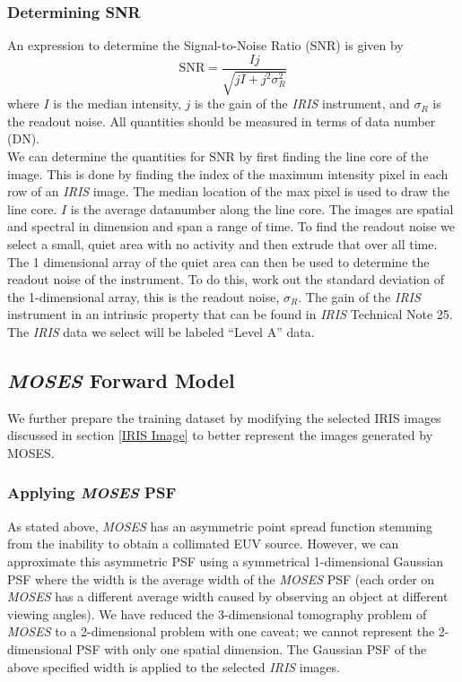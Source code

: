 \documentclass[10pt,a4paper,titlepage]{article}
\begin{document}
			\subsubsection{Determining SNR}
				An expression to determine the Signal-to-Noise Ratio (SNR) is given by 
				\begin{equation}
					\text{SNR} = \frac{I j}{ \sqrt{j I + j^2 \sigma_R^2}}
				\end{equation}
				where $I$ is the median intensity, $j$ is the gain of the \textit{IRIS} instrument, and $\sigma_R$ is the readout noise. All quantities should be measured in terms of data number (DN).\\
				We can determine the quantities for SNR by first finding the line core of the image. This is done by finding the index of the maximum intensity pixel in each row of an \textit{IRIS} image. The median location of the max pixel is used to draw the line core. $I$ is the average datanumber along the line core. The images are spatial and spectral in dimension and span a range of time. To find the readout noise we select a small, quiet area with no activity and then extrude that over all time. The 1 dimensional array of the quiet area can then be used to determine the readout noise of the instrument. To do this, work out the standard deviation of the 1-dimensional array, this is the readout noise, $\sigma_R$. The gain of the \textit{IRIS} instrument in an intrinsic property that can be found in \textit{IRIS} Technical Note 25.\\

				The \textit{IRIS} data we select will be labeled ``Level A'' data.
				
			\subsection{\textit{MOSES} Forward Model}
				We further prepare the training dataset by modifying the selected IRIS images discussed in section \ref{IRIS Image} to better represent the images generated by MOSES.
			
			\subsubsection{Applying \textit{MOSES} PSF}
				As stated above, \textit{MOSES} has an asymmetric point spread function stemming from the inability to obtain a collimated EUV source. However, we can approximate this asymmetric PSF using a symmetrical 1-dimensional Gaussian PSF where the width is the average width of the \textit{MOSES} PSF (each order on \textit{MOSES} has a different average width caused by observing an object at different viewing angles). We have reduced the 3-dimensional tomography problem of \textit{MOSES} to a 2-dimensional problem with one caveat; we cannot represent the 2-dimensional PSF with only one spatial dimension. The Gaussian PSF of the above specified width is applied to the selected \textit{IRIS} images. \\
				
\end{document}
